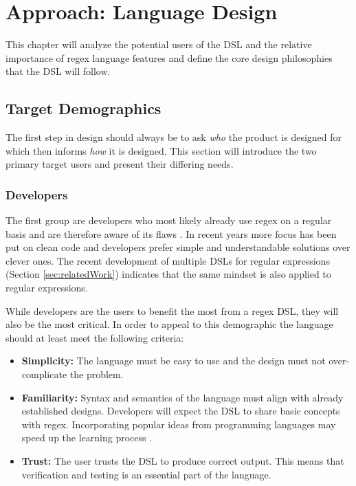 
\chapter{Approach: Language Design}

This chapter will analyze the potential users of the DSL and the relative importance of regex language features and define the core design philosophies that the DSL will follow.

\section{Target Demographics}

The first step in design should always be to ask \emph{who} the product is designed for which then informs \emph{how} it is designed. This section will introduce the two primary target users and present their differing needs.

\subsection{Developers}

The first group are developers who most likely already use regex on a regular basis and are therefore aware of its flaws \cite{RegexNotLinguaFranca}\cite{RegexesAreHard}. In recent years more focus has been put on clean code and developers prefer simple and understandable solutions over clever ones. The recent development of multiple DSLs for regular expressions (Section \ref{sec:relatedWork}) indicates that the same mindset is also applied to regular expressions.

While developers are the users to benefit the most from a regex DSL, they will also be the most critical. In order to appeal to this demographic the language should at least meet the following criteria:

\begin{itemize}
    \item \textbf{Simplicity:} 
        The language must be easy to use and the design must not over-complicate the problem. 
    \item \textbf{Familiarity:}
        Syntax and semantics of the language must align with already established designs. Developers will expect the DSL to share basic concepts with regex. Incorporating popular ideas from programming languages may speed up the learning process \cite{OnSuccessfulLanuageDesignKernighan}. 
    \item \textbf{Trust:}
        The user trusts the DSL to produce correct output. This means that verification and testing is an essential part of the language.
\end{itemize}

